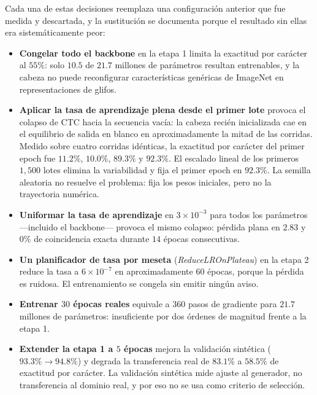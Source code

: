 Cada una de estas decisiones reemplaza una configuración anterior que fue medida
y descartada, y la sustitución se documenta porque el resultado sin ellas era
sistemáticamente peor:

\begin{itemize}
    \item \textbf{Congelar todo el backbone} en la etapa 1 limita la exactitud por
        carácter al $55\%$: solo $10{.}5$ de $21{.}7$ millones de parámetros
        resultan entrenables, y la cabeza no puede reconfigurar características
        genéricas de ImageNet en representaciones de glifos.
    \item \textbf{Aplicar la tasa de aprendizaje plena desde el primer lote}
        provoca el colapso de CTC hacia la secuencia vacía: la cabeza recién
        inicializada cae en el equilibrio de salida en blanco en
        aproximadamente la mitad de las corridas. Medido sobre cuatro corridas
        idénticas, la exactitud por carácter del primer epoch fue $11{.}2\%$,
        $10{.}0\%$, $89{.}3\%$ y $92{.}3\%$. El escalado lineal de los
        primeros $1{,}500$ lotes elimina la variabilidad y fija el primer epoch en
        $92{.}3\%$. La semilla aleatoria no resuelve el problema: fija los pesos
        iniciales, pero no la trayectoria numérica.
    \item \textbf{Uniformar la tasa de aprendizaje} en $3 \times 10^{-3}$ para
        todos los parámetros ---incluido el backbone--- provoca el mismo
        colapso: pérdida plana en $2{.}83$ y $0\%$ de coincidencia exacta
        durante $14$ épocas consecutivas.
    \item \textbf{Un planificador de tasa por meseta} (\textit{ReduceLROnPlateau})
        en la etapa 2 reduce la tasa a $6 \times 10^{-7}$ en aproximadamente $60$
        épocas, porque la pérdida es ruidosa. El entrenamiento se congela sin
        emitir ningún aviso.
    \item \textbf{Entrenar $30$ épocas reales} equivale a $360$ pasos de
        gradiente para $21{.}7$ millones de parámetros: insuficiente por dos
        órdenes de magnitud frente a la etapa 1.
    \item \textbf{Extender la etapa 1 a $5$ épocas} mejora la validación
        sintética ($93{.}3\% \rightarrow 94{.}8\%$) y degrada la transferencia
        real de $83{.}1\%$ a $58{.}5\%$ de exactitud por carácter. La validación
        sintética mide ajuste al generador, no transferencia al dominio real, y
        por eso no se usa como criterio de selección.
\end{itemize}

